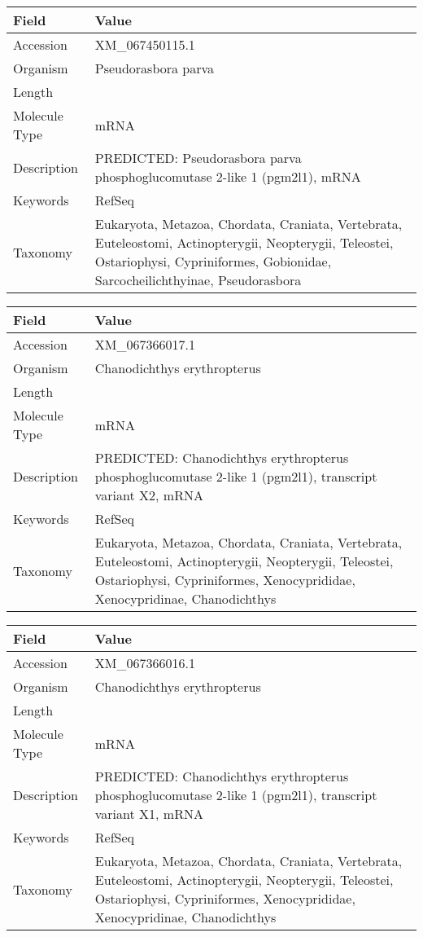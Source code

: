 \documentclass[10pt]{article}
\begin{document}
{\footnotesize
\begin{longtable}{>{\raggedright\arraybackslash}p{4.5cm} >{\raggedright\arraybackslash}p{11.5cm}}
\textbf{Field} & \textbf{Value} \\
\hline
Accession & XM\_067450115.1 \\
Organism & Pseudorasbora parva \\
Length & 3097 \\
Molecule Type & mRNA \\
Description & PREDICTED: Pseudorasbora parva phosphoglucomutase 2-like 1 (pgm2l1), mRNA \\
Keywords & RefSeq \\
Taxonomy & Eukaryota, Metazoa, Chordata, Craniata, Vertebrata, Euteleostomi, Actinopterygii, Neopterygii, Teleostei, Ostariophysi, Cypriniformes, Gobionidae, Sarcocheilichthyinae, Pseudorasbora \\
\end{longtable}
}

{\footnotesize
\begin{longtable}{>{\raggedright\arraybackslash}p{4.5cm} >{\raggedright\arraybackslash}p{11.5cm}}
\textbf{Field} & \textbf{Value} \\
\hline
Accession & XM\_067366017.1 \\
Organism & Chanodichthys erythropterus \\
Length & 3199 \\
Molecule Type & mRNA \\
Description & PREDICTED: Chanodichthys erythropterus phosphoglucomutase 2-like 1 (pgm2l1), transcript variant X2, mRNA \\
Keywords & RefSeq \\
Taxonomy & Eukaryota, Metazoa, Chordata, Craniata, Vertebrata, Euteleostomi, Actinopterygii, Neopterygii, Teleostei, Ostariophysi, Cypriniformes, Xenocyprididae, Xenocypridinae, Chanodichthys \\
\end{longtable}
}

{\footnotesize
\begin{longtable}{>{\raggedright\arraybackslash}p{4.5cm} >{\raggedright\arraybackslash}p{11.5cm}}
\textbf{Field} & \textbf{Value} \\
\hline
Accession & XM\_067366016.1 \\
Organism & Chanodichthys erythropterus \\
Length & 3727 \\
Molecule Type & mRNA \\
Description & PREDICTED: Chanodichthys erythropterus phosphoglucomutase 2-like 1 (pgm2l1), transcript variant X1, mRNA \\
Keywords & RefSeq \\
Taxonomy & Eukaryota, Metazoa, Chordata, Craniata, Vertebrata, Euteleostomi, Actinopterygii, Neopterygii, Teleostei, Ostariophysi, Cypriniformes, Xenocyprididae, Xenocypridinae, Chanodichthys \\
\end{longtable}
}
\end{document}
